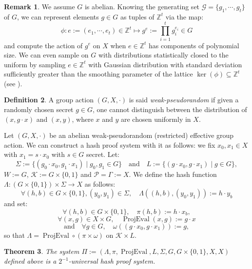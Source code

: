 \documentclass[a4paper,10pt]{report}
\theoremstyle{definition}
\newtheorem{Definition}{Definition}[chapter]
\theoremstyle{plain}
\newtheorem{Theorem}[Definition]{Theorem}
\theoremstyle{definition}
\newtheorem{Remark}[Definition]{Remark}
\newcommand{\Z}{\mathbb{Z}}
\newcommand{\m}[1]{\mathcal{#1}}
\renewcommand{\(}{\left(}
\renewcommand{\)}{\right)}
\DeclareMathOperator{\ProjEval}{ProjEval}
\begin{document}
\begin{Remark}\label{Remark 3}
We assume $G$ is abelian. Knowing the generating set $\m{G}=\{g_1,\cdots, g_t\}$ of $G$,  we can represent elements $g\in G$ as tuples of $\Z^t$ via the map:
\[\phi : e:=(e_1,\cdots, e_t)\in\Z^t\longmapsto g^e:=\prod_{i=1}^t g_i^{e_i}\in G\]
and compute the action of $g^e$ on $X$ when $e\in\Z^t$ has components of polynomial size. We can even sample on $G$ with distributions statistically closed to the uniform by sampling $e\in \Z^t$ with Gaussian distribution with standard deviation sufficiently greater than the smoothing parameter of the lattice $\ker(\phi)\subseteq \Z^t$ (see \cite[sections 3 and 4]{MaccianoRegev}). 
\end{Remark}

\begin{Definition}
A group action $(G,X,\cdot)$ is said \emph{weak-pseudorandom} if given a randomly chosen secret $g\in G$, one cannot distinguish between the distribution of $(x,g\cdot x)$ and $(x, y)$, where $x$ and $y$ are chosen uniformly in $X$.
\end{Definition}

Let $(G,X,\cdot)$ be an abelian weak-pseudorandom  (restricted) effective group action. We can construct a hash proof system with it as follows: we fix $x_0, x_1\in X$ with $x_1=s\cdot x_0$ with $s\in G$ secret. Let: 
\[\Sigma:=\{(g_0\cdot x_0,g_1\cdot x_1)\mid g_0, g_1\in G\}\quad \mbox{and} \quad L:=\{(g\cdot x_0,g\cdot x_1)\mid g\in G\},\]
$W:=G$, $\m{K}:=G\times\{0,1\}$ and $\m{P}=\Gamma:=X$.  We define the hash function $\Lambda : (G\times\{0,1\})\times\Sigma\longrightarrow X$ as follows:
\[\forall (h, b)\in G\times\{0,1\}, (y_0,y_1)\in \Sigma, \quad \Lambda((h,b),(y_0,y_1)):=h\cdot y_b\]
and set:
\[\forall (h, b)\in G\times\{0,1\}, \quad \pi(h,b):=h\cdot x_b,\]
\[\forall (x,g)\in X\times G, \quad \ProjEval(x,g):=g\cdot x\]
\[\mbox{and} \quad \forall g\in G, \quad \omega((g\cdot x_0,g\cdot x_1)):=g,\]
so that $\Lambda=\ProjEval\circ(\pi\times \omega)$ on $\m{K}\times L$.

\begin{Theorem}\cite[Theorem 1]{DeFeo1}\label{Theorem 5}
The system $\Pi:=(\Lambda,\pi,\ProjEval,L,\Sigma,G,G\times\{0,1\},X,X)$ defined above is a $2^{-1}$-universal hash proof system.
\end{Theorem}
\end{document}
